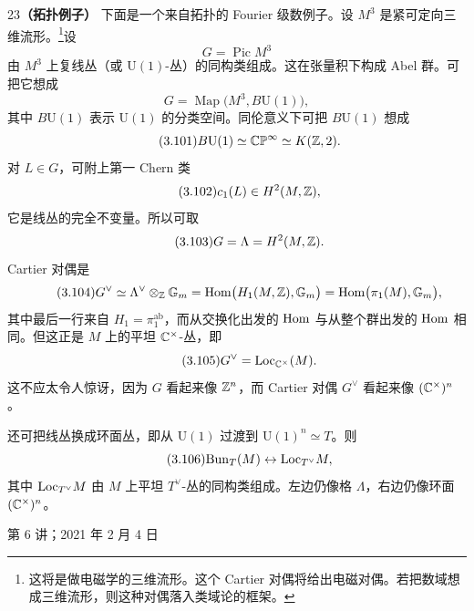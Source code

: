 \begin{srcex}{23}\textbf{（拓扑例子）}
下面是一个来自拓扑的 Fourier 级数例子。设 $M^{3}$ 是紧可定向三维流形。\footnote{这将是做电磁学的三维流形。这个 Cartier 对偶将给出电磁对偶。若把数域想成三维流形，则这种对偶落入类域论的框架。}设
\begin{equation}\tag{3.99}
G=\operatorname{Pic}M^{3}
\end{equation}
由 $M^{3}$ 上复线丛（或 $\mathrm{U}(1)$-丛）的同构类组成。这在张量积下构成 Abel 群。可把它想成
\begin{equation}\tag{3.100}
G=\operatorname{Map}\bigl(M^{3},B\mathrm{U}(1)\bigr),
\end{equation}
其中 $B\mathrm{U}(1)$ 表示 $\mathrm{U}(1)$ 的分类空间。同伦意义下可把 $B\mathrm{U}(1)$ 想成
\begin{equation}\tag{3.101}
B\mathrm{U}(1)\simeq\mathbb{C}\mathbb{P}^{\infty}\simeq K(\mathbb{Z},2).
\end{equation}
对 $L\in G$，可附上第一 Chern 类
\begin{equation}\tag{3.102}
c_1(L)\in H^{2}(M,\mathbb{Z}),
\end{equation}
它是线丛的完全不变量。所以可取
\begin{equation}\tag{3.103}
G=\Lambda=H^{2}(M,\mathbb{Z}).
\end{equation}
Cartier 对偶是
\begin{equation}\tag{3.104}
G^{\vee}\simeq\Lambda^{\vee}\otimes_{\mathbb{Z}}\mathbb{G}_m
=\mathrm{Hom}\bigl(H_1(M,\mathbb{Z}),\mathbb{G}_m\bigr)
=\mathrm{Hom}\bigl(\pi_1(M),\mathbb{G}_m\bigr),
\end{equation}
其中最后一行来自 $H_1=\pi_1^{\mathrm{ab}}$，而从交换化出发的 $\mathrm{Hom}$ 与从整个群出发的 $\mathrm{Hom}$ 相同。但这正是 $M$ 上的平坦 $\mathbb{C}^{\times}$-丛，即
\begin{equation}\tag{3.105}
G^{\vee}=\mathrm{Loc}_{\mathbb{C}^{\times}}(M).
\end{equation}
这不应太令人惊讶，因为 $G$ 看起来像 $\mathbb{Z}^{n}$，而 Cartier 对偶 $G^{\vee}$ 看起来像 $(\mathbb{C}^{\times})^{n}$。

还可把线丛换成环面丛，即从 $\mathrm{U}(1)$ 过渡到 $\mathrm{U}(1)^{n}\simeq T$。则
\begin{equation}\tag{3.106}
\mathrm{Bun}_T(M)\leftrightarrow\mathrm{Loc}_{T^{\vee}}M,
\end{equation}
其中 $\mathrm{Loc}_{T^{\vee}}M$ 由 $M$ 上平坦 $T^{\vee}$-丛的同构类组成。左边仍像格 $\Lambda$，右边仍像环面 $(\mathbb{C}^{\times})^{n}$。
\end{srcex}

\begin{flushright}\small 第 6 讲；2021 年 2 月 4 日\end{flushright}

